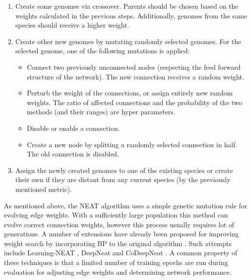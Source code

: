 \documentclass[lettersize,journal]{IEEEtran}
\begin{document}
\begin{enumerate}
\begin{enumerate}
                \item Create some genomes via crossover. Parents should be chosen based on the weights calculated in the previous steps. Additionally, genomes from the same species should receive a higher weight.
                \item Create other new genomes by mutating randomly selected genomes. For the selected genome, one of the following mutations is applied:
                \begin{itemize}
                    \item Connect two previously unconnected nodes (respecting the feed forward structure of the network). The new connection receives a random weight.
                    \item Perturb the weight of the connections, or assign entirely new random weights. The ratio of affected connections and the probability of the two methods (and their ranges) are hyper parameters.
                    \item Disable or enable a connection.
                    \item Create a new node by splitting a randomly selected connection in half. The old connection is disabled.
                \end{itemize}
                \item Assign the newly created genomes to one of the existing species or create their own if they are distant from any current species (by the previously mentioned metric).
            \end{enumerate}
        \end{enumerate}
        
		As mentioned above, the NEAT algorithm uses a simple genetic mutation rule for evolving edge weights. With a sufficiently large population this method can evolve correct connection weights, however this process usually requires lot of generations. A number of extensions have already been proposed for improving weight search by incorporating BP to the original algorithm \cite{neatsurvey}. Such attempts include Learning-NEAT \cite{lneat}, DeepNeat and CoDeepNeat \cite{codeepneat}. A common property of these techniques is that a limited number of training epochs are run during evaluation for adjusting edge weights and determining network performance. 
\end{document}
